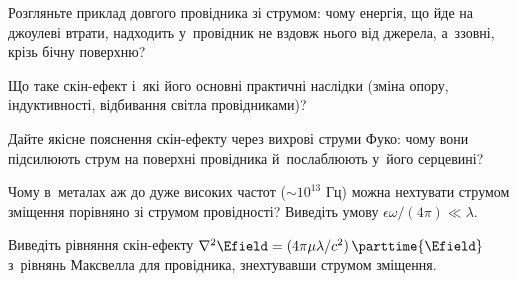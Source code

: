 \begin{Questions}
\begin{quizlist}
		\item Розгляньте приклад довгого провідника зі струмом: чому енергія, що йде на
		  джоулеві втрати, надходить у~провідник не вздовж нього від джерела, а~ззовні,
		  крізь бічну поверхню?
		\item Що таке скін-ефект і~які його основні практичні наслідки (зміна опору,
		  індуктивності, відбивання світла провідниками)?
		\item Дайте якісне пояснення скін-ефекту через вихрові струми Фуко: чому вони
		  підсилюють струм на поверхні провідника й~послаблюють у~його серцевині?
		\item Чому в~металах аж до дуже високих частот ($\sim10^{13}$ Гц) можна нехтувати
		  струмом зміщення порівняно зі струмом провідності? Виведіть умову
		  $\epsilon\omega/(4\pi) \ll \lambda$.
		\item Виведіть рівняння скін-ефекту $\nabla^2\Efield =
		  (4\pi\mu\lambda/c^2)\,\parttime{\Efield}$ з~рівнянь Максвелла для провідника,
		  знехтувавши струмом зміщення.
	\end{quizlist}
\end{Questions}